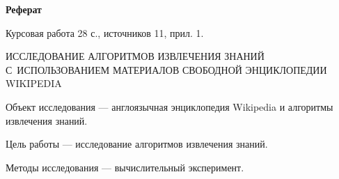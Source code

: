 \begin{center}
	\textbf{Реферат}
\end{center}

      Курсовая работа  28  с., источников  11, прил. 1.

ИССЛЕДОВАНИЕ АЛГОРИТМОВ ИЗВЛЕЧЕНИЯ ЗНАНИЙ С~ИСПОЛЬЗОВАНИЕМ МАТЕРИАЛОВ 
СВОБОДНОЙ ЭНЦИКЛОПЕДИИ WIKIPEDIA

Объект исследования --- англоязычная энциклопедия Wikipedia и алгоритмы извлечения знаний.

Цель работы --- исследование алгоритмов извлечения знаний.

Методы исследования --- вычислительный эксперимент.
